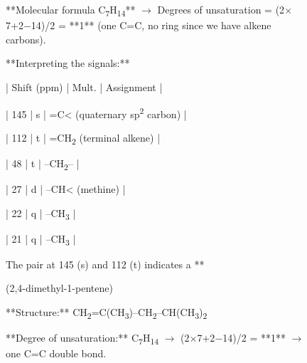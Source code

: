\begin{figure}[t]
\vspace{12pt}

\noindent
\begin{answercol}[equal height group=ansNMR]
  \caret{}\par\vspace{4pt}
  \raggedright{}\par\vspace{3pt}
  **Molecular formula C\textsubscript{7}H\textsubscript{14}** $\rightarrow$
  Degrees of unsaturation = (2$\times$7+2$-$14)/2 = **1** (one C=C, no ring
  since we have alkene carbons).\par\vspace{2pt}
  **Interpreting the signals:**\par
  {\ttfamily\scriptsize
  | Shift (ppm) | Mult. | Assignment |\par
  | 145 | s | =C< (quaternary sp\textsuperscript{2} carbon) |\par
  | 112 | t | =CH\textsubscript{2} (terminal alkene) |\par
  | 48 | t | --CH\textsubscript{2}-- |\par
  | 27 | d | --CH< (methine) |\par
  | 22 | q | --CH\textsubscript{3} |\par
  | 21 | q | --CH\textsubscript{3} |\par}
  The pair at 145 (s) and 112 (t) indicates a **\par\vspace{3pt}\elide
\end{answercol}\hspace{\columnsep}%
\begin{answercol}[equal height group=ansNMR]
  \caret{}\par\vspace{4pt}
  \raggedright{}
  (2,4-dimethyl-1-pentene)\par\vspace{2pt}
  **Structure:**
  CH\textsubscript{2}=C(CH\textsubscript{3})--CH\textsubscript{2}--CH(CH\textsubscript{3})\textsubscript{2}\par
  \vspace{3pt}
  \par\vspace{3pt}
  **Degree of unsaturation:** C\textsubscript{7}H\textsubscript{14}
  $\rightarrow$ (2$\times$7+2$-$14)/2 = **1** $\rightarrow$ one C=C double
  bond.\par\vspace{2pt}

\end{answercol}
\end{figure}
